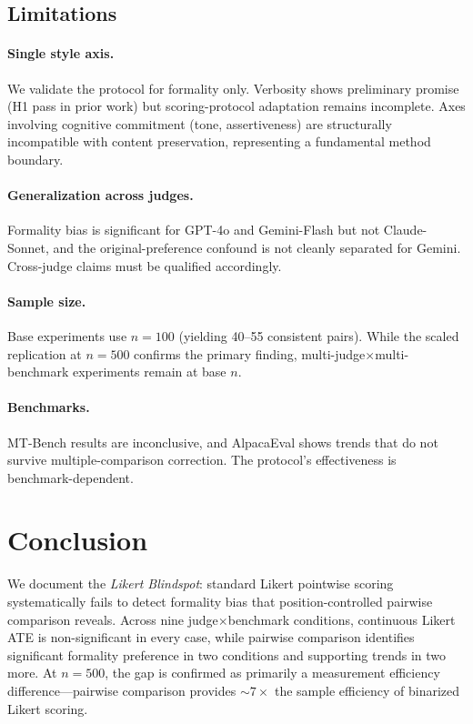 \documentclass[11pt,a4paper]{article}
\begin{document}
\subsection{Limitations}
\label{sec:limitations}

\paragraph{Single style axis.}
We validate the protocol for formality only.
Verbosity shows preliminary promise (H1 pass in prior work) but scoring-protocol adaptation remains incomplete.
Axes involving cognitive commitment (tone, assertiveness) are structurally incompatible with content preservation, representing a fundamental method boundary.

\paragraph{Generalization across judges.}
Formality bias is significant for GPT-4o and Gemini-Flash but not Claude-Sonnet, and the original-preference confound is not cleanly separated for Gemini.
Cross-judge claims must be qualified accordingly.

\paragraph{Sample size.}
Base experiments use $n{=}100$ (yielding 40--55 consistent pairs).
While the scaled replication at $n{=}500$ confirms the primary finding, multi-judge$\times$multi-benchmark experiments remain at base $n$.

\paragraph{Benchmarks.}
MT-Bench results are inconclusive, and AlpacaEval shows trends that do not survive multiple-comparison correction.
The protocol's effectiveness is benchmark-dependent.

\section{Conclusion}
\label{sec:conclusion}

We document the \emph{Likert Blindspot}: standard Likert pointwise scoring systematically fails to detect formality bias that position-controlled pairwise comparison reveals.
Across nine judge$\times$benchmark conditions, continuous Likert ATE is non-significant in every case, while pairwise comparison identifies significant formality preference in two conditions and supporting trends in two more.
At $n{=}500$, the gap is confirmed as primarily a measurement efficiency difference---pairwise comparison provides ${\sim}7\times$ the sample efficiency of binarized Likert scoring.
\end{document}
